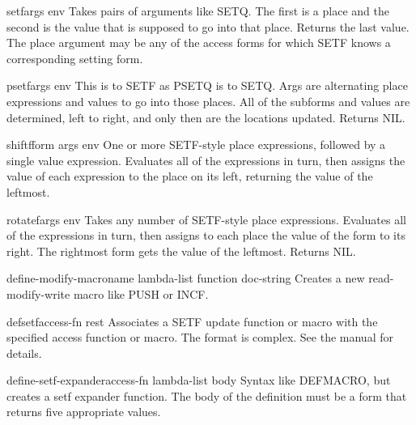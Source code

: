 \documentclass[10pt,english]{book}
\begin{document}
\begin{macro}{setf}{\rest args \env env}
  Takes pairs of arguments like SETQ. The first is a place and the second
  is the value that is supposed to go into that place. Returns the last
  value. The place argument may be any of the access forms for which SETF
  knows a corresponding setting form.
\end{macro}

\begin{macro}{psetf}{\rest args \env env}
  This is to SETF as PSETQ is to SETQ. Args are alternating place
  expressions and values to go into those places. All of the subforms and
  values are determined, left to right, and only then are the locations
  updated. Returns NIL.
\end{macro}

\begin{macro}{shiftf}{\whole form \rest args \env env}
  One or more SETF-style place expressions, followed by a single
   value expression. Evaluates all of the expressions in turn, then
   assigns the value of each expression to the place on its left,
   returning the value of the leftmost.
\end{macro}

\begin{macro}{rotatef}{\rest args \env env}
  Takes any number of SETF-style place expressions. Evaluates all of the
   expressions in turn, then assigns to each place the value of the form to
   its right. The rightmost form gets the value of the leftmost.
   Returns NIL.
\end{macro}

\begin{macro}{define-modify-macro}{name lambda-list function \op doc-string}
  Creates a new read-modify-write macro like PUSH or INCF.
\end{macro}

\begin{macro}{defsetf}{access-fn \rest rest}
  Associates a SETF update function or macro with the specified access
  function or macro. The format is complex. See the manual for details.
\end{macro}

\begin{macro}{define-setf-expander}{access-fn lambda-list \body body}
  Syntax like DEFMACRO, but creates a setf expander function. The body
  of the definition must be a form that returns five appropriate values.
\end{macro}
\end{document}
